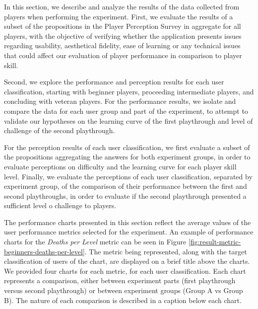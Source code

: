 In this section, we describe and analyze the results of the data collected from players when performing the experiment. First, we evaluate the results of a subset of the propositions in the Player Perception Survey in aggregate for all players, with the objective of verifying whether the application presents issues regarding usability, aesthetical fidelity, ease of learning or any technical issues that could affect our evaluation of player performance in comparison to player skill.

Second, we explore the performance and perception results for each user classification, starting with beginner players, proceeding intermediate players, and concluding with veteran players. For the performance results, we isolate and compare the data for each user group and part of the experiment, to attempt to validate our hypotheses on the learning curve of the first playthrough and level of challenge of the second playthrough.

For the perception results of each user classification, we first evaluate a subset of the propositions aggregating the answers for both experiment groups, in order to evaluate perceptions on difficulty and the learning curve for each player skill level. Finally, we evaluate the perceptions of each user classification, separated by experiment group, of the comparison of their performance between the first and second playthroughs, in order to evaluate if the second playthrough presented a sufficient level o challenge to players.

The performance charts presented in this section reflect the average values of the user performance metrics selected for the experiment. An example of performance charts for the \emph{Deaths per Level} metric can be seen in Figure \ref{fig:result-metric-beginners-deaths-per-level}. The metric being represented, along with the target classification of users of the chart, are displayed on a brief title above the charts. We provided four charts for each metric, for each user classification. Each chart represents a comparison, either between experiment parts (first playthrough versus second playthrough) or between experiment groups (Group A vs Group B). The nature of each comparison is described in a caption below each chart.


